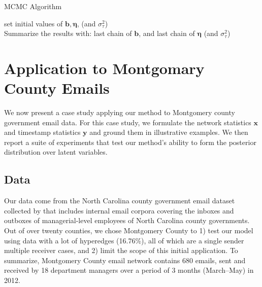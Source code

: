 \documentclass[12pt]{article}
\begin{document}
 \begin{algorithm}[H]
 	\SetAlgoLined
 	\caption{MCMC Algorithm}
 	set initial values of $\boldsymbol{b}, \boldsymbol{\eta}$, (and $\sigma_\tau^2$)\\
 	Summarize the results with: last chain of $\boldsymbol{b}$, and last chain of $\boldsymbol{\eta}$ (and $\sigma_\tau^2$) 
 				\label{alg:MCMC}
 \end{algorithm}
 	   \section{Application to Montgomary County Emails}\label{subsec:Emails}
 	  We now present a case study applying our method to Montgomery county government email data. For this case study,
 	  we formulate the network statistics $\boldsymbol{x}$ and timestamp statistics $\boldsymbol{y}$ and ground them in illustrative examples. We then report a suite of experiments that test our method’s ability to form the posterior distribution over latent variables. 
 	  	   \subsection{Data}\label{subsec:Montgomery}
 	   Our data come from the North Carolina county government email dataset collected by \cite{ben2017transparency} that includes internal email corpora covering the inboxes and outboxes of managerial-level employees of North Carolina county governments. Out of over twenty counties, we chose Montgomery County to 1) test our model using data with a lot of hyperedges (16.76\%), all of which are a single sender multiple receiver cases, and 2) limit the scope of this initial application. To summarize, Montgomery County email network contains 680 emails, sent and received by 18 department managers over a period of 3 months (March--May) in 2012. 
\end{document}
